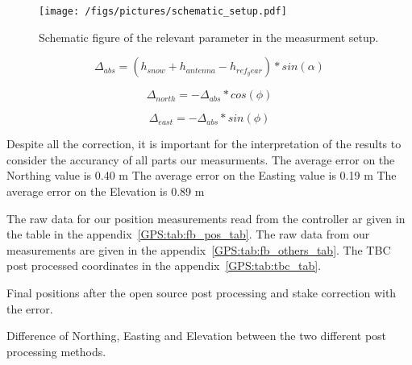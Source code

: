 \begin{figure}
\centering
\texttt{[image: /figs/pictures/schematic\_setup.pdf]}
\caption{Schematic figure of the relevant parameter in the measurment setup.}
\end{figure}


\begin{equation}
	\Delta_{abs} = (h_{snow} + h_{antenna} - h_{ref_year}) * sin(\alpha)
\end{equation}

\begin{equation}
	\Delta_{north} = - \Delta_{abs} * cos(\phi)
\end{equation}

\begin{equation}
	\Delta_{east} = - \Delta_{abs} * sin(\phi)
\end{equation}

Despite all the correction, it is important for the interpretation of the results to consider the accurancy of all parts our measurments.
The average error on the Northing value is 0.40 m  
The average error on the Easting value is 0.19 m
The average error on the Elevation is 0.89 m

The raw data for our position measurements read from the controller ar given in the table in the appendix~\ref{GPS:tab:fb_pos_tab}.
The raw data from our measurements are given in the appendix~\ref{GPS:tab:fb_others_tab}. 
The TBC post processed coordinates in the appendix~\ref{GPS:tab:tbc_tab}.

\begin{table}[h]
\caption{Final positions after the open source post processing and stake correction with the error.}
\centering

\label{GPS:tab:os_tab}
\end{table}


\begin{table}[h]
\caption{Difference of Northing, Easting and Elevation between the two different post processing methods.}
\centering

\label{GPS:tab:diff_tab}
\end{table}


